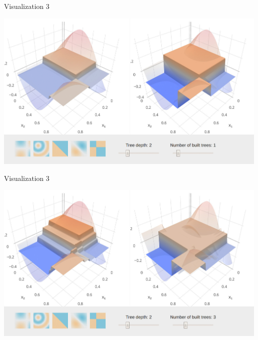 \begin{vbframe}{Visualization 3}

\begin{center}
\includegraphics[width=\textwidth]{figure_man/gbm_anim/gbm1.jpg}
\href{http://arogozhnikov.github.io/2016/06/24/gradient_boosting_explained.html}{}
\end{center}
\end{vbframe}



\begin{vbframe}{Visualization 3}

\begin{center}
\includegraphics[width=\textwidth]{figure_man/gbm_anim/gbm3.jpg}
\href{http://arogozhnikov.github.io/2016/06/24/gradient_boosting_explained.html}{}
\end{center}
\addtocounter{framenumber}{-1}

\end{vbframe}

